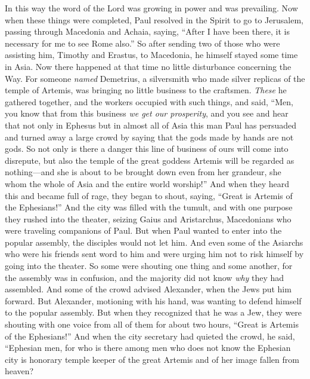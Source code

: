 \begin{biblechapter}
\verse In this way the word of the Lord was growing in power and was prevailing.
 Now when these things were completed, Paul resolved in the Spirit to go to Jerusalem, passing through Macedonia and Achaia, saying, “After I have been there, it is necessary for me to see Rome also.”
\verse So after sending two of those who were assisting him, Timothy and Erastus, to Macedonia, he himself stayed some time in Asia.
\verse Now there happened at that time no little disturbance concerning the Way.
\verse For someone \textit{named} Demetrius, a silversmith who made silver replicas of the temple of Artemis, was bringing no little business to the craftsmen.
\verse \textit{These} he gathered together, and the workers occupied with such things, and said, “Men, you know that from this business \textit{we get our prosperity},
\verse and you see and hear that not only in Ephesus but in almost all of Asia this man Paul has persuaded and turned away a large crowd by saying that the gods made by hands are not gods.
\verse So not only is there a danger this line of business of ours will come into disrepute, but also the temple of the great goddess Artemis will be regarded as nothing—and she is about to be brought down even from her grandeur, she whom the whole of Asia and the entire world worship!”
\verse And when they heard this and became full of rage, they began to shout, saying, “Great is Artemis of the Ephesians!”
\verse And the city was filled with the tumult, and with one purpose they rushed into the theater, seizing Gaius and Aristarchus, Macedonians who were traveling companions of Paul.
\verse But when Paul wanted to enter into the popular assembly, the disciples would not let him.
\verse And even some of the Asiarchs who were his friends sent word to him and were urging him not to risk himself by going into the theater.
\verse So some were shouting one thing and some another, for the assembly was in confusion, and the majority did not know \textit{why} they had assembled.
\verse And some of the crowd advised Alexander, when the Jews put him forward. But Alexander, motioning with his hand, was wanting to defend himself to the popular assembly.
\verse But when they recognized that he was a Jew, they were shouting with one voice from all of them for about two hours, “Great is Artemis of the Ephesians!”
\verse And when the city secretary had quieted the crowd, he said, “Ephesian men, for who is there among men who does not know the Ephesian city is honorary temple keeper of the great Artemis and of her image fallen from heaven?

\end{biblechapter}

